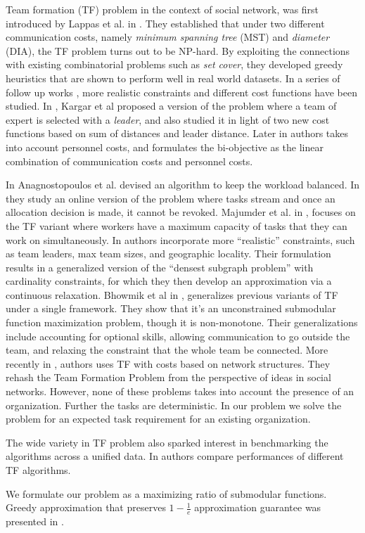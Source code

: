 Team formation (TF) problem in the context of social network, was first introduced by Lappas et al. in \cite{lappas2009finding}. They established that under two different communication costs, namely \textit{minimum spanning tree} (MST) and \textit{diameter} (DIA), the TF problem turns out to be NP-hard. By exploiting the connections with existing combinatorial problems such as \textit{set cover}, they developed greedy heuristics that are shown to perform well in real world datasets. In a series of follow up works \cite{anagnostopoulos2010power,kargar2011discovering,anagnostopoulos2012online,majumder2012capacitated,kargar2012efficient,kargar2013finding}, more realistic constraints and different cost functions have been studied. In \cite{kargar2011discovering}, Kargar et al proposed a version of the problem where a team of expert is selected with a \textit{leader}, and also studied it in light of two new cost functions based on sum of distances and leader distance. Later in \cite{kargar2012efficient,kargar2013finding} authors takes into account personnel costs, and formulates the bi-objective as the linear combination of communication costs and personnel costs. 

In \cite{anagnostopoulos2010power} Anagnostopoulos et al. devised an algorithm to keep the workload balanced. In \cite{anagnostopoulos2012online} they study an online version of the problem where tasks stream and once an allocation decision is made, it cannot be revoked. Majumder et al. in \cite{majumder2012capacitated}, focuses on the TF variant where workers have a maximum capacity of tasks that they can work on simultaneously. In \cite{rangapuram2013towards} authors incorporate more ``realistic'' constraints, such as team leaders, max team sizes, and geographic locality. Their formulation results in a generalized version of the ``densest subgraph problem'' with cardinality constraints, for which they then develop an approximation via a continuous relaxation. Bhowmik et al in \cite{bhowmik2014submodularity}, generalizes previous variants of TF under a single framework. They show that it's an unconstrained submodular function maximization problem, though it is non-monotone. Their generalizations include accounting for optional skills, allowing communication to go outside the team, and relaxing the constraint that the whole team be connected. More recently in \cite{farasat2016social}, authors uses TF with costs based on network structures. They rehash the Team Formation Problem from the perspective of ideas in social networks. However, none of these problems takes into account the presence of an organization. Further the tasks are deterministic. In our problem we solve the problem for an expected task requirement for an existing organization.

The wide variety in TF problem also sparked interest in benchmarking the algorithms across a unified data. In \cite{wang2015comparative} authors compare performances of different TF algorithms. 

We formulate our problem as a maximizing ratio of submodular functions. Greedy approximation that preserves $1 - \frac{1}{e}$ approximation guarantee was presented in \cite{bai2016algorithms}. 


